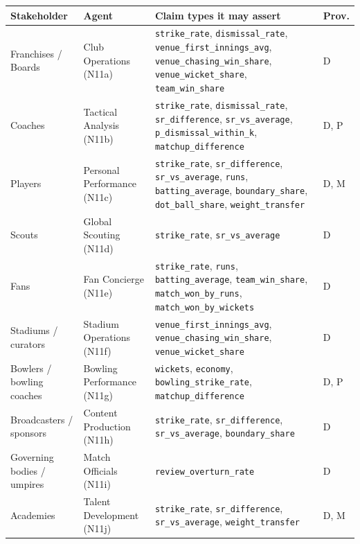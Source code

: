 \documentclass[11pt,a4paper]{article}
\begin{document}
\begin{table}[H]
\centering
\footnotesize
\renewcommand{\arraystretch}{1.25}
\begin{tabular}{@{}>{\raggedright\arraybackslash}p{3.0cm}
                  >{\raggedright\arraybackslash}p{3.4cm}
                  >{\raggedright\arraybackslash}p{7.4cm}
                  >{\raggedright\arraybackslash}p{1.0cm}@{}}
\toprule
\textbf{Stakeholder} & \textbf{Agent} & \textbf{Claim types it may assert} & \textbf{Prov.} \\
\midrule
Franchises / Boards & Club Operations (N11a) & \texttt{strike\_rate}, \texttt{dismissal\_rate}, \texttt{venue\_first\_innings\_avg}, \texttt{venue\_chasing\_win\_share}, \texttt{venue\_wicket\_share}, \texttt{team\_win\_share} & D \\
Coaches & Tactical Analysis (N11b) & \texttt{strike\_rate}, \texttt{dismissal\_rate}, \texttt{sr\_difference}, \texttt{sr\_vs\_average}, \texttt{p\_dismissal\_within\_k}, \texttt{matchup\_difference} & D, P \\
Players & Personal Performance (N11c) & \texttt{strike\_rate}, \texttt{sr\_difference}, \texttt{sr\_vs\_average}, \texttt{runs}, \texttt{batting\_average}, \texttt{boundary\_share}, \texttt{dot\_ball\_share}, \texttt{weight\_transfer} & D, M \\
Scouts & Global Scouting (N11d) & \texttt{strike\_rate}, \texttt{sr\_vs\_average} & D \\
Fans & Fan Concierge (N11e) & \texttt{strike\_rate}, \texttt{runs}, \texttt{batting\_average}, \texttt{team\_win\_share}, \texttt{match\_won\_by\_runs}, \texttt{match\_won\_by\_wickets} & D \\
Stadiums / curators & Stadium Operations (N11f) & \texttt{venue\_first\_innings\_avg}, \texttt{venue\_chasing\_win\_share}, \texttt{venue\_wicket\_share} & D \\
Bowlers / bowling coaches & Bowling Performance (N11g) & \texttt{wickets}, \texttt{economy}, \texttt{bowling\_strike\_rate}, \texttt{matchup\_difference} & D, P \\
Broadcasters / sponsors & Content Production (N11h) & \texttt{strike\_rate}, \texttt{sr\_difference}, \texttt{sr\_vs\_average}, \texttt{boundary\_share} & D \\
Governing bodies / umpires & Match Officials (N11i) & \texttt{review\_overturn\_rate} & D \\
Academies & Talent Development (N11j) & \texttt{strike\_rate}, \texttt{sr\_difference}, \texttt{sr\_vs\_average}, \texttt{weight\_transfer} & D, M \\

\end{tabular}
\end{table}
\end{document}
